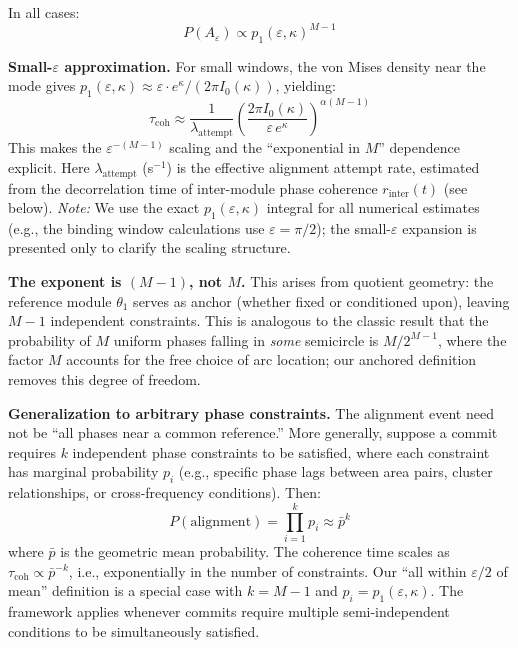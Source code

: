 \documentclass[12pt]{article}
\makeatletter
\providecommand{\DIFaddtex}[1]{{\protect\color{blue}\uwave{#1}}} %
\providecommand{\DIFdeltex}[1]{{\protect\color{red}\sout{#1}}} %
\providecommand{\DIFaddbegin}{} %
\providecommand{\DIFaddend}{} %
\providecommand{\DIFdelbegin}{} %
\providecommand{\DIFdelend}{} %
\providecommand{\DIFadd}[1]{\texorpdfstring{\DIFaddtex{#1}}{#1}} %
\providecommand{\DIFdel}[1]{\texorpdfstring{\DIFdeltex{#1}}{}} %
\providecommand{\DIFscaledelfig}{0.5}
\newlength{\DIFdelgraphicswidth} %
\newlength{\DIFdelgraphicsheight} %
\providecommand{\DIFaddincludegraphics}[2][]{{\color{blue}\fbox{\DIFOincludegraphics[#1]{#2}}}} %
\providecommand{\DIFdelincludegraphics}[2][]{%
\sbox{\DIFdelgraphicsbox}{\DIFOincludegraphics[#1]{#2}}%
\settoboxwidth{\DIFdelgraphicswidth}{\DIFdelgraphicsbox} %
\settoboxtotalheight{\DIFdelgraphicsheight}{\DIFdelgraphicsbox} %
\scalebox{\DIFscaledelfig}{%
\parbox[b]{\DIFdelgraphicswidth}{\usebox{\DIFdelgraphicsbox}\\[-\baselineskip] \rule{\DIFdelgraphicswidth}{0em}}\llap{\resizebox{\DIFdelgraphicswidth}{\DIFdelgraphicsheight}{%
\setlength{\unitlength}{\DIFdelgraphicswidth}%
\begin{picture}(1,1)%
\thicklines\linethickness{2pt} %
{\color[rgb]{1,0,0}\put(0,0){\framebox(1,1){}}}%
{\color[rgb]{1,0,0}\put(0,0){\line( 1,1){1}}}%
{\color[rgb]{1,0,0}\put(0,1){\line(1,-1){1}}}%
\end{picture}%
}\hspace*{3pt}}} %
} %
\DeclareRobustCommand{\DIFaddbegin}{\DIFOaddbegin \let\includegraphics\DIFaddincludegraphics} %
\DeclareRobustCommand{\DIFaddend}{\DIFOaddend \let\includegraphics\DIFOincludegraphics} %
\DeclareRobustCommand{\DIFdelbegin}{\DIFOdelbegin \let\includegraphics\DIFdelincludegraphics} %
\DeclareRobustCommand{\DIFdelend}{\DIFOaddend \let\includegraphics\DIFOincludegraphics} %
\let\sout@orig\sout %
\renewcommand{\sout}[1]{\ifmmode\text{\sout@orig{\ensuremath{#1}}}\else\sout@orig{#1}\fi} %
\makeatother
\begin{document}
In all cases:
\begin{equation}\label{eq:coh-mises}
P(A_\varepsilon) \propto p_1(\varepsilon, \kappa)^{M-1}
\end{equation}

\textbf{Small-$\varepsilon$ approximation.} For small windows, the von Mises density near the mode gives $p_1(\varepsilon, \kappa) \approx \varepsilon \cdot e^\kappa / (2\pi I_0(\kappa))$, yielding:
\[
\tau_{\mathrm{coh}} \approx \frac{1}{\lambda_{\mathrm{attempt}}} \left( \frac{2\pi I_0(\kappa)}{\varepsilon \, e^\kappa} \right)^{\alpha(M-1)}
\]
This makes the \DIFdelbegin \DIFdel{$\varepsilon^{-(M-1)}$ }\DIFdelend \DIFaddbegin \DIFadd{$\varepsilon^{-\alpha(M-1)}$ }\DIFaddend scaling and the ``exponential in $M$'' dependence explicit. Here $\lambda_{\mathrm{attempt}}$ (s$^{-1}$) is the effective alignment attempt rate, estimated from the decorrelation time of inter-module phase coherence $r_{\mathrm{inter}}(t)$ (see below). \emph{Note:} We use the exact $p_1(\varepsilon, \kappa)$ integral for all numerical estimates (e.g., the binding window calculations use $\varepsilon = \pi/2$); the small-$\varepsilon$ expansion is presented only to clarify the scaling structure.

\textbf{The exponent is $(M-1)$, not $M$.} This arises from quotient geometry: the reference module $\theta_1$ serves as anchor (whether fixed or conditioned upon), leaving $M-1$ independent constraints. This is analogous to the classic result that the probability of $M$ uniform phases falling in \emph{some} semicircle is $M/2^{M-1}$, where the factor $M$ accounts for the free choice of arc location; our anchored definition removes this degree of freedom.

\textbf{Generalization to arbitrary phase constraints.} The alignment event need not be ``all phases near a common reference.'' More generally, suppose a commit requires $k$ independent phase constraints to be satisfied, where each constraint has marginal probability $p_i$ (e.g., specific phase lags between area pairs, cluster relationships, or cross-frequency conditions). Then:
\[
P(\text{alignment}) = \prod_{i=1}^k p_i \approx \bar{p}^k
\]
where $\bar{p}$ is the geometric mean probability. The coherence time scales as $\tau_{\mathrm{coh}} \propto \bar{p}^{-k}$, i.e., exponentially in the number of constraints. Our ``all within $\varepsilon/2$ of mean'' definition is a special case with $k = M-1$ and $p_i = p_1(\varepsilon, \kappa)$. The framework applies whenever commits require multiple semi-independent conditions to be simultaneously satisfied.
\end{document}

